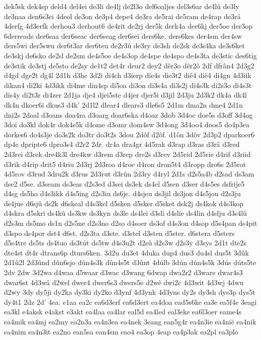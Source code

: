 {dek5sk
dek4sp
deld4
del4ei
de3li
de4lj
de2l3o
del6oaljes
del3s6ar
de4lú
de3ly
de3naa
den6s3ei
4deol
de3on
de3p4
depe4
de3ra
de5rai
de5ram
de4rap
de3râ
4derfg
4d3erfk
derhou3
derhout6
de4rit
de2rj
der5k
derk4a
der6kj
der5oe
der3op
6derreads
der6saa
der6seac
der6seag
der6sei
ders6ke.
ders6kes
der4sm
der4sw
ders5wi
der5swu
der6t3ar
der6teu
de2r3û
de3ry
de3sh
de2sk
de3s4ka
de3s6ket
de3skj
de6sko
de2sl
de2sm
de4s5oe
de4s3op
de4spe
de4spo
de4s3ta
de3stic
des6tig
de3stik
de3stj
de5sto
de2sy
de1t2
det4r
deur2
dey2
dêr3o
dêr2ô
2df
dfrân4
2d3g2
d4gd
dge2t
dg4l
2d1h
d3he
3d2i
di4ch
d3ierp
die4s
die3t2
diê4
dië4
di4gn
4d3iik
dikan4
di2ki
4d3ikk
di4me
din4sp
di5oa
di3on
di3s4a
di3s2j
di4s3k
di2s3o
di4s3t
dis4y
di2t3r
di4zer
2d1ja
dje4
djei5ste
d4jer
djer5i
d3jil
2d3ju
2d3k2
dk4a
dk4l
dk4n
dkoer6i
dkus3
d4k'
2d1l2
dlear4
dlears3
dle6s5
2d1m
dma2n
dme4
2d1n
dni2s
2doal
d3oans
doa4ra
d3oarg
doar6ska
d4oaz
3dob
3d4oc
doe5s
d3off
3d4og
3doi
do3kl
dok4r
dok4s5k
d4ome
d3omr
dom4sw
3d4ong
3d4oo4
doos5
do4p3ea
dorkes6
do4s3je
do3s2k
do3tr
do3t2s
3dou
2dôf
d2ôf.
d1ôn
3dôv
2d3p2
dparkoer6
dp4e
dpripte6
dpro3s4
d2r2
2dr.
dr4a
dra4gr
4d5rak
d3rap
d3ras
d3râ
d3red
2d3rei
d3rek
dre4k3l
dre4kw
d3rem
d3rep
dre2s
d3rev
2d5rid
2d5rie
d4rif
d3riid
d3rik
d4rip
drit5
d4riu
2d3rj
2d3roa
d4roe
d4ron
dron5t4
d3ropp
dro6s
2d5rot
4d5rov
d3rud
3dru2k
d3rus
2d3rut
d3rûn
2d3ry
d4ryl
2d1s
d2s5a4b
d2sad
ds3am
dse2
d5se.
d3seam
ds3eas
d2s3ed
d3sei
ds3ek
ds4el
d5sen
d3ser
d4s5es
dsfrije5
d4sg
ds5ho
d4s3ikk
d4s5ing
d2s3iu
ds6je.
d4sjeu
ds3jil
ds3jon
d4s5jou
d2s3ju
ds4jue
d6sjû
ds2k
d6skeal
d4s3kel
d5sken
d5sker
d5sket
dsk2j
ds4kok
d4s3kop
d4skra
d5skri
ds4kû
ds3kw
ds3kyn
ds3le
ds4lei
d3sli
d4slie
ds4lin
d4slju
d3s4lû
d2s3m
ds5mo
ds1n
d2s5ne
d2s3no
d2so
d4soer
ds3of
d4s3on
d4sop
d5s4pan
ds4pit
d3spo
ds4por
dst4
d6st.
d2s3ta
d3ste.
d3stel
d3sten
d5ster.
d6stera
d5sters
d5s4tre
ds5ts
ds4tuo
ds3tút
ds5tw
d4s3u2t
d2sû
d2s3w
d2s3y
d3sys
2d1t
dte2s
dte4st
dt4r
dtrans6p
dturs6ken.
3d2u
du3et
4duka
dup4
dus3
du4sl
dus5t
3dûk
2d1û2l
2d3ûnd
dûn6sjo
dûn4s3k
dûn4s5t
d3ûnt
4dúlb
3dún
dún4s5k
3dús
dúts5te
2dv
2dw
3d2wa
d4waa
d5waar
d3wac
d3wang
6dwap
dwa2r2
d3ware
dwar4s3
dwar6st
4d3wâ
d2wel
dwer4
dwer6s3
dwers5e
d2wê
dwi2c
4d3wit
4d3wj
4dwu
d2wy
3dy
dy5ji
dy2ka
dy3ki
dy2ko
d3ynf
4d3ynk
4d3yns
dy2s
dy3sh
dys3p
dys5t
dy4t1
2dz
2d'
4ea.
e1aa
ea2c
ea6d3erf
ea6d3ert
ea4doa
ead5s6ke
ea3e
ea5f4e
3eagi
ea3kl
e4aksk
e4akst
e3akt
ea4laa
ea4lar
eal5d
ea4led
eal3eke
ea6l3oer
eame4s
ea4mik
ea4mj
ea2my
ea2n3a
ea4n3ea
ea4nek
3eang
ean5g4r
ea4n3ie
ea4nië
ea4nik
ea4nim
ea4n3it
ea2no
ean5sa
ean4sm
eao4
ea3op
4eap
ea4p3ak
ea2pl
ea3plo
}

